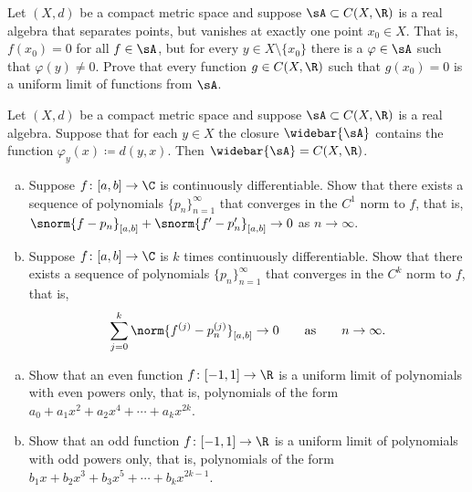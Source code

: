 \begin{exercise}
Let $(X,d)$ be a compact metric space and
suppose $\sA \subset C(X,\R)$ is a real algebra that separates points, but
vanishes at exactly one point $x_0 \in X$.
That is, $f(x_0) = 0$ for all $f \in \sA$,
but for every $y \in X \setminus \{ x_0 \}$ there is
a $\varphi \in \sA$ such that $\varphi(y) \not= 0$.  Prove that
every function $g \in C(X,\R)$ such that $g(x_0) = 0$ is a uniform limit
of functions from $\sA$.
\end{exercise}

\begin{exercise}
Let $(X,d)$ be a compact metric space and
suppose $\sA \subset C(X,\R)$ is a real algebra.
Suppose that for each $y \in X$ the closure $\widebar{\sA}$
contains the function $\varphi_y(x) \coloneqq d(y,x)$.
Then $\widebar{\sA} = C(X,\R)$.
\end{exercise}

\begin{exercise}
\pagebreak[2]
\leavevmode
\begin{enumerate}[a)]
\item
Suppose $f \colon [a,b] \to \C$ is continuously 
differentiable.  Show that there exists a sequence of polynomials
$\{ p_n \}_{n=1}^\infty$
that converges in the $C^1$ norm to $f$, that is,
$\snorm{f - p_n}_{[a,b]} + \snorm{f'-p_n'}_{[a,b]} \to 0$ as $n \to \infty$.
\item
Suppose $f \colon [a,b] \to \C$ is $k$ times continuously 
differentiable.  Show that there exists a sequence of polynomials
$\{ p_n \}_{n=1}^\infty$
that converges in the $C^k$ norm to $f$, that is,
\begin{equation*}
\sum_{j=0}^k \norm{f^{(j)} - p_n^{(j)}}_{[a,b]} \to 0 \qquad \text{as} \qquad
n \to \infty.
\end{equation*}
\end{enumerate}
\end{exercise}

\begin{exercise}
\pagebreak[2]
\leavevmode
\begin{enumerate}[a)]
\item
Show that an even function $f \colon [-1,1] \to \R$ is a uniform
limit of polynomials with even powers only, that is, polynomials
of the form $a_0 + a_1 x^2 + a_2 x^4 + \cdots + a_k x^{2k}$.
\item
Show that an odd function $f \colon [-1,1] \to \R$ is a uniform
limit of polynomials with odd powers only, that is, polynomials
of the form $b_1 x + b_2 x^3 + b_3 x^5 + \cdots + b_k x^{2k-1}$.
\end{enumerate}
\end{exercise}

